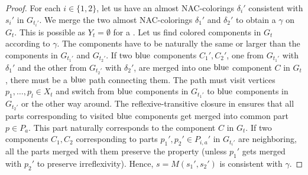 %
\begin{proof}
	For each \( i \in \{1, 2\} \),
	let us have an almost NAC-colorings \( \delta_i' \) consistent with
	\( s_i' \) in \( G_{t_i'} \).
	We merge the two almost NAC-colorings \( \delta_1' \) and \( \delta_2' \)
	to obtain a \rbcol{} \( \gamma \) on \( G_t \).
	This is possible as \( Y_t = \emptyset \) for a \JoinNode{}.
	Let us find colored components in \( G_t \) according to \(	\gamma \).
	The components have to be naturally the same or larger
	than the components in \( G_{t_1'} \) and \( G_{t_2'} \).
	If two \( \text{blue} \) components \( C_1', C_2' \),
	one from \( G_{t_1'} \) with \( \delta_1' \) and
	the other from \( G_{t_2'} \) with \( \delta_2' \),
	are merged into one \( \text{blue} \) component \( C \) in \( G_t \),
	there must be a \( \text{blue} \) path connecting them.
	The path must visit vertices \( p_1, \dots, p_l \in X_t \)
	and switch from \( \text{blue} \) components in \( G_{t_1'} \)
	to \( \text{blue} \) components in \( G_{t_2'} \) or the other way around.
	The reflexive-transitive closure in 
	ensures that all parts corresponding to visited \( \text{blue} \) components
	get merged into common part \( p \in P_a \).
	This part naturally corresponds to the component \( C \) in \( G_t \).
	If two components \( C_1, C_2 \) corresponding to
	parts \( p_1', p_2' \in P_{i,a}' \) in \( G_{t_i'} \) are neighboring,
	all the parts merged with them preserve the property
	(unless \( p_1' \) gets merged with \( p_2' \) to preserve irreflexivity).
	Hence, \( s = M(s_1', s_2') \) is consistent with \( \gamma \).
\end{proof}

